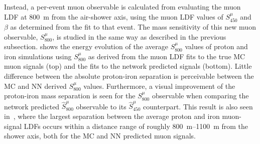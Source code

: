 



Instead, a per-event muon observable is calculated from evaluating the muon LDF at \qty{800}{\meter} from the air-shower axis, using the muon LDF values of $S^{\mu}_{450}$ and $\beta$ as determined from the fit to that event.
The mass sensitivity of this new muon observable, $S^{\mu}_{800}$, is studied in the same way as described in the previous subsection.
 shows the energy evolution of the average $S^{\mu}_{800}$ values of proton and iron simulations using $S^{\mu}_{800}$ as derived from the muon LDF fits to the true MC muon signals (top) and the fits to the network predicted signals (bottom).
Little difference between the absolute proton-iron separation is perceivable between the MC and NN derived $S^{\mu}_{800}$ values.
Furthermore, a visual improvement of the proton-iron mass separation is seen for the $S^{\mu}_{800}$ observable when comparing the network predicted $\hat{S}^{\mu}_{800}$ observable to its $\hat{S}^{\mu}_{450}$ counterpart.
This result is also seen in~, where the largest separation between the average proton and iron muon-signal LDFs occurs within a distance range of roughly \qtyrange{800}{1100}{\meter} from the shower axis, both for the MC and NN predicted muon signals. 

